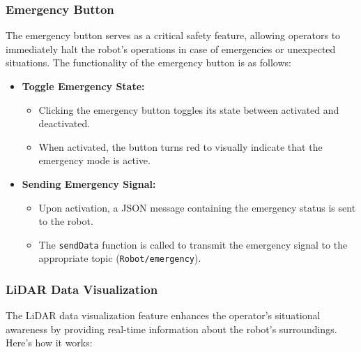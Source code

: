 \documentclass{article}
\begin{document}
    \subsubsection{Emergency Button}
    The emergency button serves as a critical safety feature, allowing operators to immediately halt the robot's operations in case of emergencies or unexpected situations. The functionality of the emergency button is as follows:
    \begin{itemize}
        \item \textbf{Toggle Emergency State:}
            \begin{itemize}
                \item Clicking the emergency button toggles its state between activated and deactivated.
                \item When activated, the button turns red to visually indicate that the emergency mode is active.
            \end{itemize}
        
        \item \textbf{Sending Emergency Signal:}
            \begin{itemize}
                \item Upon activation, a JSON message containing the emergency status is sent to the robot.
                \item The \texttt{sendData} function is called to transmit the emergency signal to the appropriate topic (\texttt{Robot/emergency}).
            \end{itemize}
    \end{itemize}

\subsubsection{LiDAR Data Visualization}
    The LiDAR data visualization feature enhances the operator's situational awareness by providing real-time information about the robot's surroundings. Here's how it works:
\end{document}
